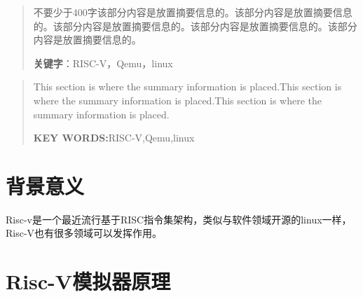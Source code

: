 \documentclass[UTF8,a4paper]{ctexart}
\begin{document}
      
\newpage
{}
\renewcommand{\abstractname}{\heiti{\Large{摘\quad \quad \quad \quad 要}}}
\begin{abstract}
{\large{不要少于400字该部分内容是放置摘要信息的。该部分内容是放置摘要信息的。该部分内容是放置摘要信息的。该部分内容是放置摘要信息的。该部分内容是放置摘要信息的。}}

\noindent %
    {\large{\textbf{关键字}：RISC-V，Qemu，linux}}
\end{abstract}

\newpage
\renewcommand{\abstractname}{\Large \textbf{ABSTRACT}}
\begin{abstract}
{\large{This section is where the summary information is placed.This section is where the summary information is placed.This section is where the summary information is placed.}}

\noindent
\textbf{KEY WORDS:}RISC-V,Qemu,linux
\end{abstract}

\newpage
\tableofcontents
\thispagestyle{empty}

\newpage
{}

\section{背景意义}
Risc-v是一个最近流行基于RISC指令集架构，类似与软件领域开源的linux一样，Risc-V也有很多领域可以发挥作用。

\section{Risc-V模拟器原理}
\end{document}
